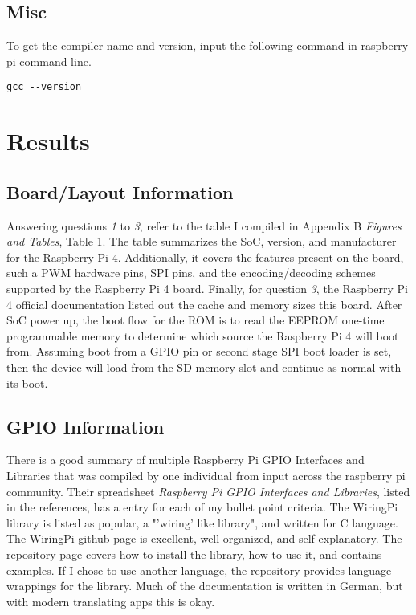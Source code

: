 \documentclass[journal]{IEEEtran}
\begin{document}
    \subsection{Misc}

    To get the compiler name and version, input the following command in raspberry pi command line.
    \begin{lstlisting}[frame=single]
      gcc --version
    \end{lstlisting}

    \section{Results}
    \subsection{Board/Layout Information}
    Answering questions \emph{1} to \emph{3}, refer to the table I compiled in Appendix B \emph{Figures and Tables}, Table 1. 
    The table summarizes the SoC, version, and manufacturer for the Raspberry Pi 4.
    Additionally, it covers the features present on the board, such a PWM hardware pins, SPI pins, and the encoding/decoding schemes supported by the Raspberry Pi 4 board.
    Finally, for question \emph{3}, the Raspberry Pi 4 official documentation listed out the cache and memory sizes this board.
    After SoC power up, the boot flow for the ROM is to read the EEPROM one-time programmable memory to determine which source the Raspberry Pi 4 will boot from.
    Assuming boot from a GPIO pin or second stage SPI boot loader is set, then the device will load from the SD memory slot and continue as normal with its boot. 

    \subsection{GPIO Information}
    There is a good summary of multiple Raspberry Pi GPIO Interfaces and Libraries that was compiled by one individual from input across the raspberry pi community.
    Their spreadsheet \emph{Raspberry Pi GPIO Interfaces and Libraries}, listed in the references, has a entry for each of my bullet point criteria.
    The WiringPi library is listed as popular, a "'wiring' like library", and written for C language.
    The WiringPi github page is excellent, well-organized, and self-explanatory.
    The repository page covers how to install the library, how to use it, and contains examples. 
    If I chose to use another language, the repository provides language wrappings for the library.
    Much of the documentation is written in German, but with modern translating apps this is okay.
\end{document}
